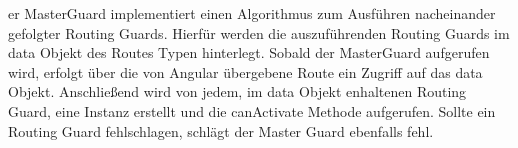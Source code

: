 \begin{description}
	er MasterGuard implementiert einen Algorithmus zum Ausführen nacheinander gefolgter Routing Guards. Hierfür werden die auszuführenden Routing Guards im data Objekt des Routes Typen hinterlegt. Sobald der MasterGuard aufgerufen wird, erfolgt über die von Angular übergebene Route ein Zugriff auf das data Objekt. Anschlie{\ss}end wird von jedem, im data Objekt enhaltenen Routing Guard, eine Instanz erstellt und die canActivate Methode aufgerufen. Sollte ein Routing Guard fehlschlagen, schlägt der Master Guard ebenfalls fehl.

\end{description}

